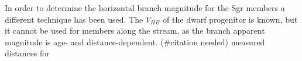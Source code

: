 \documentclass{emulateapj}
\begin{document}
In order to determine the horizontal branch magnitude for the Sgr members a different technique has been used. The $V_{HB}$ of the dwarf progenitor is known, but it cannot be used for members along the stream, as the branch apparent magnitude is age- and distance-dependent. (\#citation needed) measured distances for 
	
		

		
\end{document}
